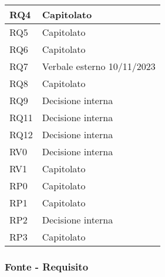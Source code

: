 \begin{center}
\begin{longtable}{|C{5cm}|C{5cm}|}
        \hline
        RQ4 & Capitolato \\
        \hline
        RQ5 & Capitolato \\
        \hline
        RQ6 & Capitolato \\
        \hline
        RQ7 & Verbale esterno 10/11/2023 \\
        \hline
        RQ8 & Capitolato \\
        \hline
        RQ9 &  Decisione interna \\
        \hline
        RQ11 & Decisione interna \\
        \hline
        RQ12 & Decisione interna \\
        \hline
        RV0 & Decisione interna \\
        \hline
        RV1 & Capitolato \\
        \hline
        RP0 & Capitolato \\
        \hline
        RP1 & Capitolato \\
        \hline
        RP2 & Decisione interna \\
        \hline
        RP3 & Capitolato \\
        \hline
    \end{longtable}
\end{center}


  \subsubsection{Fonte - Requisito}

